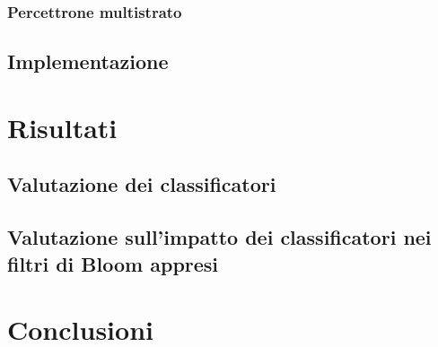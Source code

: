 \documentclass{report}
\begin{document}
\subsection{Percettrone multistrato}

\section{Implementazione}

\chapter{Risultati}

\section{Valutazione dei classificatori}


\section{Valutazione sull'impatto dei classificatori nei filtri di Bloom appresi}

\chapter{Conclusioni}


\printbibliography
\end{document}
